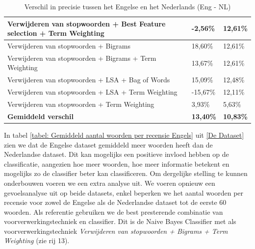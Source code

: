 \begin{table}[h]
\begin{adjustbox}{width=1\textwidth}
\begin{tabular}{|l|l|l|}
Verwijderen van stopwoorden + Best Feature selection + Term Weighting         & -2,56\%                                           & 12,61\%                                  \\ \hline
Verwijderen van stopwoorden + Bigrams                                     & 18,60\%                                           & 12,61\%                                  \\ \hline
Verwijderen van stopwoorden + Bigrams + Term Weighting                    & 13,67\%                                           & 12,61\%                                  \\ \hline
Verwijderen van stopwoorden + LSA + Bag of Words                   & 15,09\%                                           & 12,48\%                                  \\ \hline
Verwijderen van stopwoorden + LSA + Term Weighting                            & -15,67\%                                          & 12,11\%                                  \\ \hline
Verwijderen van stopwoorden + Term Weighting                                         & 3,93\%                                            & 5,63\%                                   \\ \hline
{\bf Gemiddeld verschil}                                                             & {\bf 13,40\%}                                     & {\bf 10,83\%}                            \\ \hline
\end{tabular}
\end{adjustbox}
\caption{Verschil in precisie tussen het Engelse en het Nederlands (Eng - NL)}
\label{tabel: verschil engels en nederlandse prestatie}
\end{table}

In tabel \ref{tabel: Gemiddeld aantal woorden per recensie Engels} uit \ref{De Dataset} zien we dat de Engelse dataset gemiddeld meer woorden heeft dan de Nederlandse dataset. Dit kan mogelijks een positieve invloed hebben op de classificatie, aangezien hoe meer woorden, hoe meer informatie betekent en mogelijks zo de classifier beter kan classificeren. Om dergelijke stelling te kunnen onderbouwen voeren we een extra analyse uit. We voeren opnieuw een gevoelsanalyse uit op beide datasets, enkel beperken we het aantal woorden per recensie voor zowel de Engelse als de Nederlandse dataset tot de eerste 60 woorden. Als referentie gebruiken we de best presterende combinatie van voorverwerkingstechniek en classifier. Dit is de Naive Bayes Classifier met als voorverwerkingstechniek \textit{Verwijderen van stopwoorden + Bigrams + Term Weighting} (zie rij 13).\\

